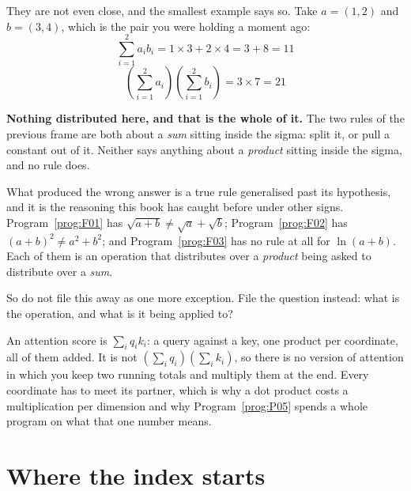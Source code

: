 \begin{fr}
They are not even close, and the smallest example says so. Take $a = (1, 2)$
and $b = (3, 4)$, which is the pair you were holding a moment ago:
\[ \sum_{i=1}^{2} a_i b_i = 1 \times 3 + 2 \times 4 = 3 + 8 = 11 \]
\[ \left(\sum_{i=1}^{2} a_i\right)\left(\sum_{i=1}^{2} b_i\right)
   = 3 \times 7 = 21 \]

\begin{trapbox}
\textbf{Nothing distributed here, and that is the whole of it.} The two rules
of the previous frame are both about a \emph{sum} sitting inside the sigma:
split it, or pull a constant out of it. Neither says anything about a
\emph{product} sitting inside the sigma, and no rule does.

What produced the wrong answer is a true rule generalised past its hypothesis,
and it is the reasoning this book has caught before under other signs.
Program~\ref{prog:F01} has $\sqrt{a+b} \ne \sqrt{a} + \sqrt{b}$;
Program~\ref{prog:F02} has $(a+b)^{2} \ne a^{2} + b^{2}$; and
Program~\ref{prog:F03} has no rule at all for $\ln(a + b)$. Each of them is an
operation that distributes over a \emph{product} being asked to distribute over
a \emph{sum}.

So do not file this away as one more exception. File the question instead:
what is the operation, and what is it being applied to?
\end{trapbox}

\begin{aibox}
An attention score is $\sum_i q_i k_i$: a query against a key, one product per
coordinate, all of them added. It is not
$\left(\sum_i q_i\right)\left(\sum_i k_i\right)$, so there is no version of
attention in which you keep two running totals and multiply them at the end.
Every coordinate has to meet its partner, which is why a dot product costs a
multiplication per dimension and why Program~\ref{prog:P05} spends a whole
program on what that one number means.
\end{aibox}
\end{fr}

\section{Where the index starts}
\label{sec:F04-index}


